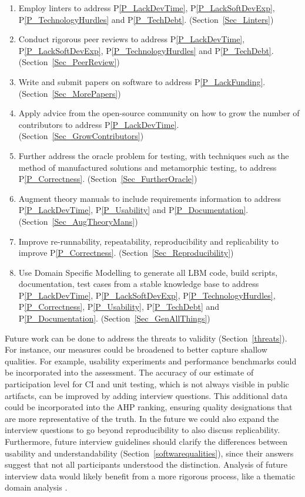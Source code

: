 \documentclass[final, 3p, times, authoryear]{elsarticle}
\newcommand{\ppref}[1]{P\ref{#1}}
\begin{document}
\begin{enumerate}
	\item Employ linters to address \ppref{P_LackDevTime}, \ppref{P_LackSoftDevExp}, \ppref{P_TechnologyHurdles} and \ppref{P_TechDebt}. (Section~\ref{Sec_Linters})
	\item Conduct rigorous peer reviews to address \ppref{P_LackDevTime},
	\ppref{P_LackSoftDevExp}, \ppref{P_TechnologyHurdles} and
	\ppref{P_TechDebt}.	(Section~\ref{Sec_PeerReview})
	\item Write and submit papers on software to address \ppref{P_LackFunding}.
	(Section~\ref{Sec_MorePapers})
	\item Apply advice from the open-source community on how to grow the number
	of contributors to address \ppref{P_LackDevTime}.
	(Section~\ref{Sec_GrowContributors})
	\item Further address the oracle problem for testing, with techniques such as the method of manufactured solutions and metamorphic testing, to address
	\ppref{P_Correctness}. (Section~\ref{Sec_FurtherOracle})
	\item Augment theory manuals to include requirements information to address
	\ppref{P_LackDevTime}, \ppref{P_Usability} and \ppref{P_Documentation}.
	(Section~\ref{Sec_AugTheoryMans})
	\item Improve re-runnability, repeatability, reproducibility and
	replicability to improve \ppref{P_Correctness}.
	(Section~\ref{Sec_Reproducibility})
	\item Use Domain Specific Modelling to generate all LBM code, build scripts,
	documentation, test cases from a stable knowledge base to address
	\ppref{P_LackDevTime}, \ppref{P_LackSoftDevExp},
	\ppref{P_TechnologyHurdles}, \ppref{P_Correctness}, \ppref{P_Usability},
	\ppref{P_TechDebt} and \ppref{P_Documentation}.
	(Section~\ref{Sec_GenAllThings})
\end{enumerate}

Future work can be done to address the threats to validity
(Section~\ref{threats}).  For instance, our measures could be broadened to
better capture shallow qualities. For example, usability experiments and
performance benchmarks could be incorporated into the assessment. The accuracy
of our estimate of participation level for CI and unit
testing, which is not always visible in public artifacts, can be improved by
adding interview questions. This additional data could be incorporated into the
AHP ranking, ensuring quality designations that are more representative of the
truth. In the future we could also expand the interview questions to go beyond
reproducibility to also discuss replicability. Furthermore, future interview
guidelines should clarify the differences between usability and
understandability (Section~\ref{softwarequalities}), since their answers suggest
that not all participants understood the distinction.  Analysis of future
interview data would likely benefit from a more rigorous process, like a
thematic domain analysis \citep{JungEtAl2022}.
\end{document}

